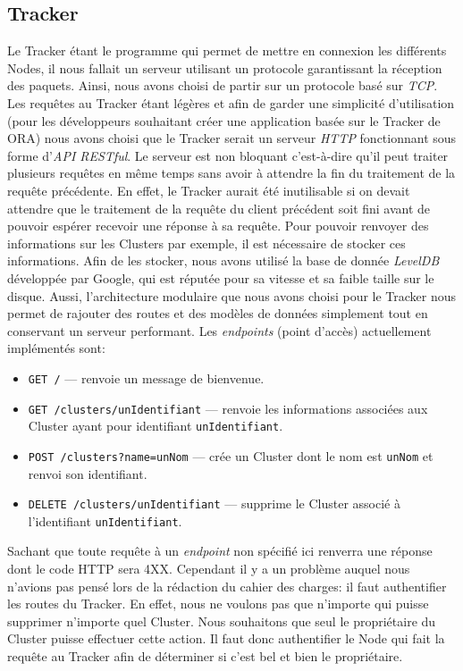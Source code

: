 \documentclass[11pt, a4paper]{report}
\begin{document}
    \subsection{Tracker}
      Le Tracker étant le programme qui permet de mettre en connexion les différents Nodes, il nous fallait un serveur utilisant un protocole garantissant la réception des paquets. Ainsi, nous avons choisi de partir sur un protocole basé sur \textit{TCP}. Les requêtes au Tracker étant légères et afin de garder une simplicité d'utilisation (pour les développeurs souhaitant créer une application basée sur le Tracker de ORA) nous avons choisi que le Tracker serait un serveur \textit{HTTP} fonctionnant sous forme d'\textit{API RESTful}. Le serveur est non bloquant c'est-à-dire qu'il peut traiter plusieurs requêtes en même temps sans avoir à attendre la fin du traitement de la requête précédente. En effet, le Tracker aurait été inutilisable si on devait attendre que le traitement de la requête du client précédent soit fini avant de pouvoir espérer recevoir une réponse à sa requête. Pour pouvoir renvoyer des informations sur les Clusters par exemple, il est nécessaire de stocker ces informations. Afin de les stocker, nous avons utilisé la base de donnée \textit{LevelDB} développée par Google, qui est réputée pour sa vitesse et sa faible taille sur le disque. Aussi, l'architecture modulaire que nous avons choisi pour le Tracker nous permet de rajouter des routes et des modèles de données simplement tout en conservant un serveur performant.
      \bigskip
      Les \textit{endpoints} (point d'accès) actuellement implémentés sont:
      \begin{itemize}
          \item \verb|GET /| --- renvoie un message de bienvenue.
          \item \verb|GET /clusters/unIdentifiant| --- renvoie les informations associées aux Cluster ayant pour identifiant \verb|unIdentifiant|.
          \item \verb|POST /clusters?name=unNom| --- crée un Cluster dont le nom est \verb|unNom| et renvoi son identifiant.
          \item \verb|DELETE /clusters/unIdentifiant| --- supprime le Cluster associé à l'identifiant \verb|unIdentifiant|.
      \end{itemize}
      \bigskip

      Sachant que toute requête à un \textit{endpoint} non spécifié ici renverra une réponse dont le code HTTP sera 4XX.
      Cependant il y a un problème auquel nous n'avions pas pensé lors de la rédaction du cahier des charges: il faut authentifier les routes du Tracker. En effet, nous ne voulons pas que n'importe qui puisse supprimer n'importe quel Cluster. Nous souhaitons que seul le propriétaire du Cluster puisse effectuer cette action. Il faut donc authentifier le Node qui fait la requête au Tracker afin de déterminer si c'est bel et bien le propriétaire.\newline
\end{document}
